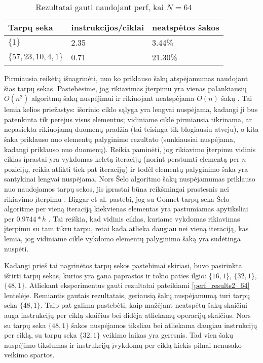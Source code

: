 \documentclass{VUMIFInfBakalaurinis}
\begin{document}
\begin{table}[H]
  \caption{Rezultatai gauti naudojant perf, kai $N = 64$}
  \label{perf_results_64}
  \centering
  \begin{tabular}{@{}lll@{}}
  Tarpų seka            & instrukcijos/ciklai     & neatspėtos šakos \\ \midrule
  $\{1\}$               & 2.35                    & 3.44\%           \\
  $\{57,23,10,4,1\}$    & 0.71                    & 21.30\%          \\ \bottomrule
  \end{tabular}
\end{table}


Pirmiausia reikėtų išnagrinėti, nuo ko priklauso šakų atspėjamumas naudojant šias tarpų sekas.
Pastebėsime, jog rikiavimas įterpimu yra vienas palankiausių $O(n^2)$ algoritmų šakų nuspėjimui
ir rikiuojant neatspėjama $O(n)$ šakų \cite{biggar2005sorting}.
Tai lemia kelios priežastys: išorinio ciklo sąlyga yra lengvai nuspėjama, kadangi ji bus patenkinta tik perėjus visus elementus;
vidiniame cikle pirmiausia tikrinama, ar nepasiekta rikiuojamų duomenų pradžia (tai teisinga tik blogiausiu atveju),
o kita šaka priklauso nuo elementų palyginimo rezultato (sunkiausiai nuspėjama, kadangi priklauso nuo duomenų).
Reikia paminėti, jog rikiavimo įterpimu vidinis ciklas įprastai yra vykdomas keletą iteracijų (norint perstumti elementą per $n$ pozicijų, reikia atlikti tiek pat iteracijų)
ir todėl elementų palyginimo šaka yra santykinai lengvai nuspėjama.
Nors Šelo algoritmo šakų nuspėjamumas priklauso nuo naudojamos tarpų sekos, jis įprastai būna reikšmingai prastesnis nei rikiavimo įterpimu \cite{biggar2005sorting}.
Biggar et al. pastebi, jog su Gonnet tarpų seka Šelo algoritme per vieną iteraciją kiekvienas elementas yra pastumiamas apytiksliai per $0.9744 * h$ \cite{biggar2008experimental}.
Tai reiškia, kad vidinis ciklas, kuriame vykdomas rikiavimas įterpimu su tam tikru tarpu, retai kada atlieka daugiau nei vieną iteraciją, kas lemia, jog
vidiniame cikle vykdomo elementų palyginimo šaką yra sudėtinga nuspėti.

Kadangi prieš tai nagrinėtos tarpų sekos pastebimai skiriasi, buvo pasirinkta ištirti tarpų sekas, kurios yra gana paprastos ir tokio paties ilgio: $\{16, 1\}$, $\{32, 1\}$, $\{48, 1\}$.
Atliekant eksperimentus gauti rezultatai pateikiami \ref{perf_results2_64} lentelėje.
Remiantis gautais rezultatais, geriausią šakų nuspėjamumą turi tarpų seka $\{48, 1\}$.
Taip pat galima pastebėti, kaip mažėjant neatspėtų šakų skaičiui auga instrukcijų per ciklą skaičius bei didėja atliekamų operacijų skaičius.
Nors su tarpų seka $\{48, 1\}$ šakos nuspėjamos tiksliau bei atliekama daugiau instrukcijų per ciklą, su tarpų seka $\{32, 1\}$ veikimo laikas yra geresnis.
Tad vien šakų nuspėjimo tikslumas ir instrukcijų įvykdomų per ciklą kiekis pilnai nenusako veikimo spartos. 
\end{document}
